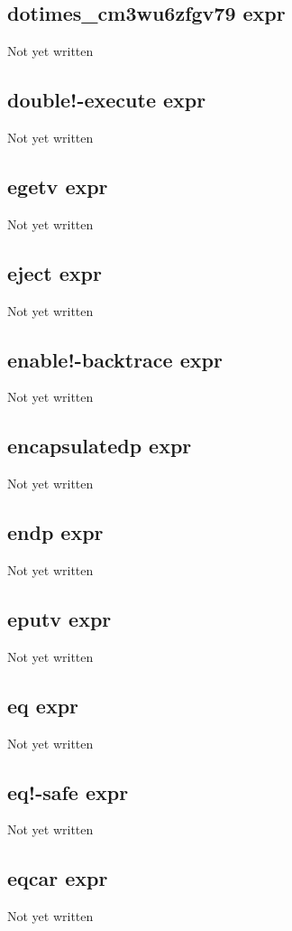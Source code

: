 \documentclass[a4paper,11pt]{article}
\begin{document}
\subsection{\ttfamily dotimes\_cm3wu6zfgv79 expr}
Not yet written

\subsection{\ttfamily double!-execute expr}
Not yet written

\subsection{\ttfamily egetv expr}
Not yet written

\subsection{\ttfamily eject expr}
Not yet written

\subsection{\ttfamily enable!-backtrace expr}
Not yet written

\subsection{\ttfamily encapsulatedp expr}
Not yet written

\subsection{\ttfamily endp expr}
Not yet written

\subsection{\ttfamily eputv expr}
Not yet written

\subsection{\ttfamily eq expr}
Not yet written

\subsection{\ttfamily eq!-safe expr}
Not yet written

\subsection{\ttfamily eqcar expr}
Not yet written
\end{document}
